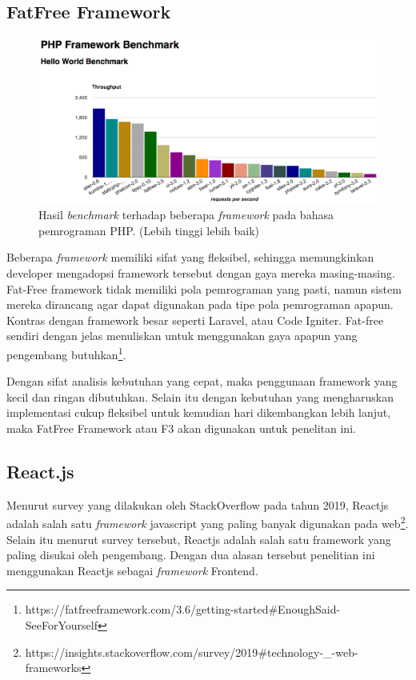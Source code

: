 \subsection{FatFree Framework}

\begin{figure}[H]
    \centering
    \includegraphics[width=0.6\paperwidth]{Gambar/php-framework-benchmark-20170214.png}
    \caption{Hasil \textit{benchmark} terhadap beberapa \textit{framework} pada
        bahasa pemrograman PHP\protect\cite{kenjis:framework-benchmark}. (Lebih
        tinggi lebih baik)}
    \label{fig:chart-benchmark-php-framework}
\end{figure}

Beberapa \textit{framework} memiliki sifat yang fleksibel, sehingga memungkinkan
developer mengadopsi framework tersebut dengan gaya mereka masing-masing.
Fat-Free framework tidak memiliki pola pemrograman yang pasti, namun sistem
mereka dirancang agar dapat digunakan pada tipe pola pemrograman apapun. Kontras
dengan framework besar seperti Laravel, atau Code Igniter. Fat-free sendiri
dengan jelas menuliskan untuk menggunakan gaya apapun yang pengembang
butuhkan\footnote{https://fatfreeframework.com/3.6/getting-started\#EnoughSaid-SeeForYourself}.
 
Dengan sifat analisis kebutuhan yang cepat, maka penggunaan framework yang kecil
dan ringan dibutuhkan. Selain itu dengan kebutuhan yang mengharuskan
implementasi cukup fleksibel untuk kemudian hari dikembangkan lebih lanjut, maka
FatFree Framework atau F3 akan digunakan untuk penelitan ini.

\subsection{React.js}
    Menurut survey yang dilakukan oleh StackOverflow pada tahun 2019, Reactjs
    adalah salah satu \textit{framework} javascript yang paling banyak digunakan
    pada
    web\footnote{https://insights.stackoverflow.com/survey/2019{\#}technology-{\_}-web-frameworks}.
    Selain itu menurut survey tersebut, Reactjs adalah salah satu framework yang
    paling disukai oleh pengembang. Dengan dua alasan tersebut penelitian ini
    menggunakan Reactjs sebagai \textit{framework} Frontend.

